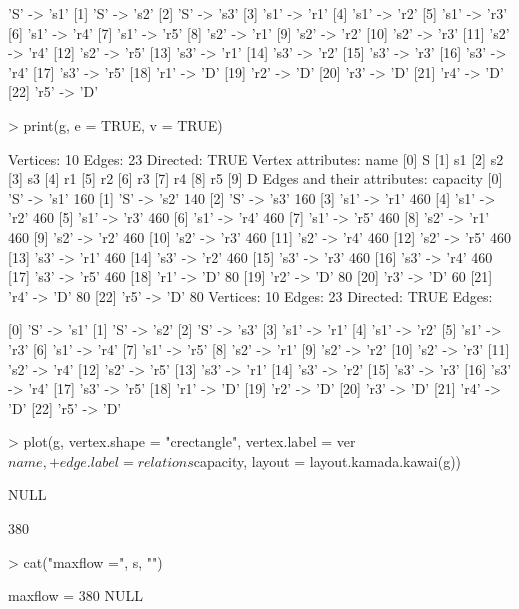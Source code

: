 \documentclass[a4paper,11pt]{scrartcl}
\begin{document}
\begin{Schunk}
\begin{Soutput}
[0]  'S'  -> 's1'
[1]  'S'  -> 's2'
[2]  'S'  -> 's3'
[3]  's1' -> 'r1'
[4]  's1' -> 'r2'
[5]  's1' -> 'r3'
[6]  's1' -> 'r4'
[7]  's1' -> 'r5'
[8]  's2' -> 'r1'
[9]  's2' -> 'r2'
[10] 's2' -> 'r3'
[11] 's2' -> 'r4'
[12] 's2' -> 'r5'
[13] 's3' -> 'r1'
[14] 's3' -> 'r2'
[15] 's3' -> 'r3'
[16] 's3' -> 'r4'
[17] 's3' -> 'r5'
[18] 'r1' -> 'D' 
[19] 'r2' -> 'D' 
[20] 'r3' -> 'D' 
[21] 'r4' -> 'D' 
[22] 'r5' -> 'D' 
\end{Soutput}
\begin{Sinput}
> print(g, e = TRUE, v = TRUE)
\end{Sinput}
\begin{Soutput}
Vertices: 10 
Edges: 23 
Directed: TRUE 
Vertex attributes:
    name
[0]    S
[1]   s1
[2]   s2
[3]   s3
[4]   r1
[5]   r2
[6]   r3
[7]   r4
[8]   r5
[9]    D
Edges and their attributes:
                  capacity
[0]  'S'  -> 's1'      160
[1]  'S'  -> 's2'      140
[2]  'S'  -> 's3'      160
[3]  's1' -> 'r1'      460
[4]  's1' -> 'r2'      460
[5]  's1' -> 'r3'      460
[6]  's1' -> 'r4'      460
[7]  's1' -> 'r5'      460
[8]  's2' -> 'r1'      460
[9]  's2' -> 'r2'      460
[10] 's2' -> 'r3'      460
[11] 's2' -> 'r4'      460
[12] 's2' -> 'r5'      460
[13] 's3' -> 'r1'      460
[14] 's3' -> 'r2'      460
[15] 's3' -> 'r3'      460
[16] 's3' -> 'r4'      460
[17] 's3' -> 'r5'      460
[18] 'r1' -> 'D'        80
[19] 'r2' -> 'D'        80
[20] 'r3' -> 'D'        60
[21] 'r4' -> 'D'        80
[22] 'r5' -> 'D'        80
Vertices: 10 
Edges: 23 
Directed: TRUE 
Edges:
                 
[0]  'S'  -> 's1'
[1]  'S'  -> 's2'
[2]  'S'  -> 's3'
[3]  's1' -> 'r1'
[4]  's1' -> 'r2'
[5]  's1' -> 'r3'
[6]  's1' -> 'r4'
[7]  's1' -> 'r5'
[8]  's2' -> 'r1'
[9]  's2' -> 'r2'
[10] 's2' -> 'r3'
[11] 's2' -> 'r4'
[12] 's2' -> 'r5'
[13] 's3' -> 'r1'
[14] 's3' -> 'r2'
[15] 's3' -> 'r3'
[16] 's3' -> 'r4'
[17] 's3' -> 'r5'
[18] 'r1' -> 'D' 
[19] 'r2' -> 'D' 
[20] 'r3' -> 'D' 
[21] 'r4' -> 'D' 
[22] 'r5' -> 'D' 
\end{Soutput}
\begin{Sinput}
> plot(g, vertex.shape = "crectangle", vertex.label = ver$name, 
+     edge.label = relations$capacity, layout = layout.kamada.kawai(g))
\end{Sinput}
\begin{Soutput}
NULL
\end{Soutput}
\begin{Soutput}
[1] 380
\end{Soutput}
\begin{Sinput}
> cat("maxflow =", s, "\n")
\end{Sinput}
\begin{Soutput}
maxflow = 380 
NULL
\end{Soutput}
\end{Schunk}
\end{document}
